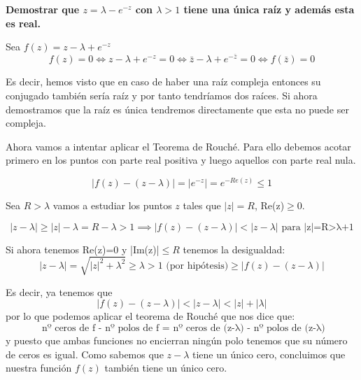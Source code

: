\documentclass{apuntes}
\begin{document}
\begin{example}
\textbf{Demostrar que $z=λ-e^{-z}$ con $λ>1$ tiene una única raíz y además esta es real.}

Sea $f(z)=z-λ+e^{-z}$
\[f(z)=0 \iff z-λ+e^{-z} = 0 \iff \bar{z}-λ+e^{-\bar{z}}=0 \iff f(\bar{z})=0\]

Es decir, hemos visto que en caso de haber una raíz compleja entonces su conjugado también sería raíz y por tanto tendríamos dos raíces. Si ahora demostramos que la raíz es única tendremos directamente que esta no puede ser compleja.

Ahora vamos a intentar aplicar el Teorema de Rouché. Para ello debemos acotar primero en los puntos con parte real positiva y luego aquellos con parte real nula.

\[|f(z)-(z-λ)|=|e^{-z}|=e^{-Re(z)} \leq 1\]

Sea $R>λ$ vamos a estudiar los puntos $z$ tales que $|z|=R$, Re(z)$\geq 0$.

\[|z-λ|\geq |z|-λ = R - λ > 1 \implies |f(z)-(z-λ)| < |z-λ| \text{ para |z|=R>λ+1}\]

Si ahora tenemos Re(z)=0 y |Im(z)|$\leq R$ tenemos la desigualdad:
\[|z-λ| = \sqrt{|z|^2+λ^2}\geq λ > 1 \text{ (por hipótesis)} \geq |f(z)-(z-λ)|\]

Es decir, ya tenemos que
\[|f(z)-(z-λ)|<|z-λ|<|z|+|λ|\]
por lo que podemos aplicar el teorema de Rouché que nos dice que:
\[\text{ nº ceros de  f - nº polos de f = nº ceros de (z-λ) - nº polos de (z-λ)}\]
y puesto que ambas funciones no encierran ningún polo tenemos que su número de ceros es igual. Como sabemos que $z-λ$ tiene un único cero, concluimos que nuestra función $f(z)$ también tiene un único cero.
\end{example}
\end{document}
